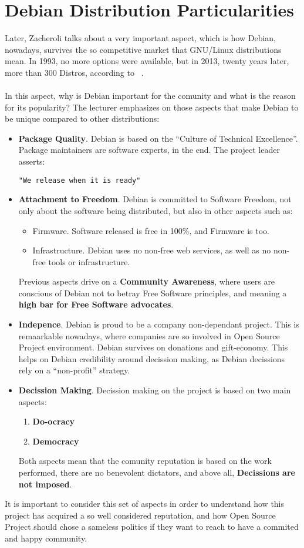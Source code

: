 \documentclass[11pt]{article}
\begin{document}
\section{Debian Distribution Particularities}
Later, Zacheroli talks about a very important aspect, which is how Debian, nowadays, survives the so competitive market that GNU/Linux distributions mean. In 1993, no more options were available, but in 2013, twenty years later, more than 300 Distros, according to ~\cite{DISTW00}.\\
\\
In this aspect, why is Debian important for the comunity and what is the reason for its popularity? The lecturer emphasizes on those aspects that make Debian to be unique compared to other distributions:
\begin{itemize}
\item{\textbf{Package Quality}}. Debian is based on the ``Culture of Technical Excellence''. Package maintainers are software experts, in the end. The project leader asserts:
\begin{verbatim}
"We release when it is ready"
\end{verbatim}
\item{\textbf{Attachment to Freedom}}. Debian is committed to Software Freedom, not only about the software being distributed, but also in other aspects such as:
\begin{itemize}\itemsep0pt
\item{Firmware}. Software released is free in 100\%, and Firmware is too.
\item{Infrastructure}. Debian uses no non-free web services, as well as no non-free tools or infrastructure.
\end{itemize}
Previous aspects drive on a \textbf{Community Awareness}, where users are conscious of Debian not to betray Free Software principles, and meaning a \textbf{high bar for Free Software advocates}.
\item{\textbf{Indepence}}. Debian is proud to be a company non-dependant project. This is remaarkable nowadays, where companies are so involved in Open Source Project environment. Debian survives on donations and gift-economy. This helps on Debian credibility around decission making, as Debian decissions rely on a ``non-profit'' strategy.
\item{\textbf{Decission Making}}. Decission making on the project is based on two main aspects:
\begin{enumerate}\itemsep0pt
\item{\textbf{Do-ocracy}}
\item{\textbf{Democracy}}
\end{enumerate}
Both aspects mean that the comunity reputation is based on the work performed, there are no benevolent dictators, and above all, \textbf{Decissions are not imposed}.
\end{itemize}
It is important to consider this set of aspects in order to understand how this project has acquired a so well considered reputation, and how Open Source Project should chose a sameless politics if they want to reach to have a commited and happy community.
\end{document}
